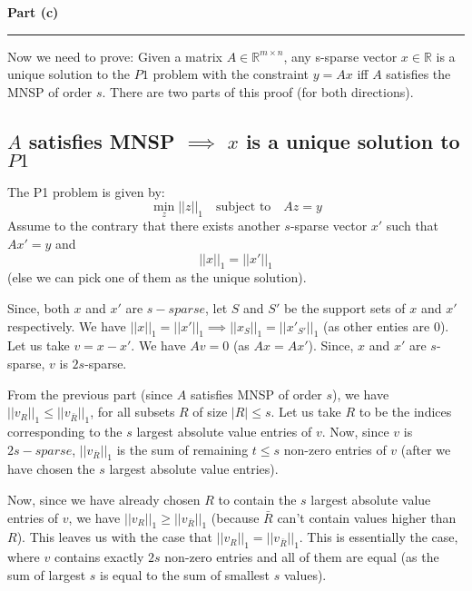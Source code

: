 \documentclass[a4paper,12pt]{article}
\newenvironment{solution}[2][]{%
    \begin{mdframed}[linecolor=blue!70!black, linewidth=2pt, roundcorner=10pt, backgroundcolor=yellow!10!white, skipabove=12pt, skipbelow=12pt]%
        \textbf{\large #2}
        \par\noindent\rule{\textwidth}{0.4pt}
}{
    \end{mdframed}
}
\begin{document}
\begin{solution}{Part (c)}
  Now we need to prove:
  Given a matrix $A \in \mathbb{R}^{m\times n}$, any s-sparse vector $x \in \mathbb{R}$ is a unique solution to the $P1$ problem with the constraint $y = Ax$ iff $A$ satisfies the MNSP of order $s$. There are two parts of this proof (for both directions).

  \subsection*{$A$ satisfies MNSP $\implies$ $x$ is a unique solution to $P1$}
  The P1 problem is given by:
  \[
    \min_{z}||z||_1 \quad \text{subject to} \quad Az = y
  \]
  Assume to the contrary that there exists another $s$-sparse vector $x'$ such that $Ax' = y$ and $$||x||_1 = ||x'||_1$$ (else we can pick one of them as the unique solution). 

  Since, both $x$ and $x'$ are $s-sparse$, let $S$ and $S'$ be the support sets of $x$ and $x'$ respectively. We have $||x||_1 = ||x'||_1 \implies ||x_S||_1 = ||x'_{S'}||_1$ (as other enties are 0). Let us take $v = x - x'$. We have $Av = 0$ (as $Ax = Ax'$). Since, $x$ and $x'$ are $s$-sparse, $v$ is $2s$-sparse. 

  From the previous part (since $A$ satisfies MNSP of order $s$), we have $||v_R||_1 \leq ||v_{\bar{R}}||_1$, for all subsets $R$ of size $|R| \leq s$. Let us take $R$ to be the indices corresponding to the $s$ largest absolute value entries of $v$. Now, since $v$ is $2s-sparse$, $||v_{\bar{R}}||_1$ is the sum of remaining $t \leq s$ non-zero entries of $v$ (after we have chosen the $s$ largest absolute value entries).
  
  Now, since we have already chosen $R$ to contain the $s$ largest absolute value entries of $v$, we have $||v_R||_1 \geq ||v_{\bar{R}}||_1$ (because $\bar{R}$ can't contain values higher than $R$). This leaves us with the case that $||v_R||_1 = ||v_{\bar{R}}||_1$. This is essentially the case, where $v$ contains exactly $2s$ non-zero entries and all of them are equal (as the sum of largest $s$ is equal to the sum of smallest $s$ values). 
\end{solution}
\end{document}
